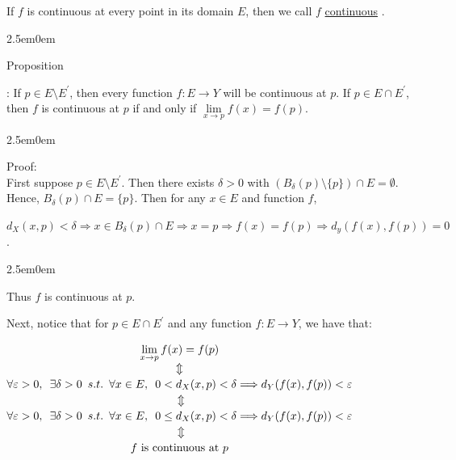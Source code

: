 \documentclass{book}
\newcommand{\hTwo}{%
   \color{MidnightBlue}%
   \fontsize{13}{15}\selectfont%
}
\newcommand{\hThree}{%
   \color{PineGreen}
   \fontsize{13}{15}\selectfont%
}
\newenvironment{myIndent}{%
   \begin{adjustwidth}{2.5em}{0em}%
}{%
   \end{adjustwidth}%
}
\newcommand{\udefine}[1]{%
   \setulcolor{Red}%
   \setul{0.14em}{0.07em}%
   \ul{#1}%
}
\newcommand{\retTwo}{\hfill\bigbreak}
\newcommand{\suchthat}{ \hspace{0.5em}s.t.\hspace{0.5em}}
\newcommand{\myHS}{ \hspace{0.5em}}
\newcounter{PropNumber}
\newcommand{\propCount}[1][1]{%
   \addtocounter{PropNumber}{#1}%
   \thePropNumber%
}
\begin{document}
   If $f$ is continuous at every point in its domain $E$, then we call $f$ \udefine{continuous}. \retTwo

   {\begin{myIndent} \hTwo
      Proposition \propCount: If $p \in E\setminus E^\prime$, then every function $f: E \rightarrow Y$ will be continuous at $p$. If $p \in E \cap E^\prime$, then $f$ is continuous at $p$ if and only if $\lim\limits_{x\rightarrow p}f(x) = f(p)$. \retTwo
      
      {\begin{myIndent} \hThree
         Proof:\\
         First suppose $p \in E\setminus E^\prime$. Then there exists $\delta > 0$ with $(B_\delta(p) \setminus \{p\}) \cap E = \emptyset$. Hence, $B_\delta(p) \cap E = \{p\}$. Then for any $x \in E$ and function $f$,
      \end{myIndent}}{\hThree
         {\center $ d_X(x, p) < \delta \Rightarrow x \in B_\delta(p) \cap E \Rightarrow x = p \Rightarrow f(x) = f(p) \Rightarrow d_y(f(x), f(p)) = 0$. \retTwo\par}
      }{\begin{myIndent} \hThree
         Thus $f$ is continuous at $p$. \retTwo

         \newpage

         Next, notice that for $p \in E \cap E^\prime$ and any function $f: E \rightarrow Y$, we have that:\\

         {\center${\displaystyle
         \begin{matrix}
            \lim\limits_{x\rightarrow p}f(x) = f(p) \\
            \Updownarrow \\
            \vphantom{\int^b}\forall \varepsilon > 0, \myHS \exists \delta > 0 \suchthat \forall x \in E, \myHS 0 < d_X(x, p) < \delta \Longrightarrow d_Y(f(x), f(p)) < \varepsilon \\
            \vphantom{\int^b}\Updownarrow \\
            \vphantom{\int^b}\forall \varepsilon > 0, \myHS \exists \delta > 0 \suchthat \forall x \in E, \myHS 0 \leq d_X(x, p) < \delta \Longrightarrow d_Y(f(x), f(p)) < \varepsilon \\
            \vphantom{\int^b}\Updownarrow \\
            \vphantom{\int^b}f \text{ is continuous at } p
         \end{matrix}
         }$\par} \retTwo\retTwo
      \end{myIndent}}


\end{myIndent}}
\end{document}
